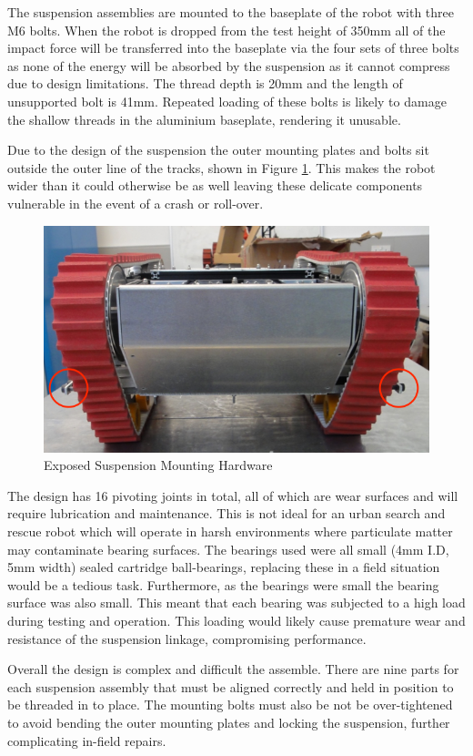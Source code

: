 The suspension assemblies are mounted to the baseplate of the robot with three M6 bolts. When the robot is dropped from the test height of 350mm all of the impact force will be transferred into the baseplate via the four sets of three bolts as none of the energy will be absorbed by the suspension as it cannot compress due to design limitations. The thread depth is 20mm and the length of unsupported bolt is 41mm. Repeated loading of these bolts is likely to damage the shallow threads in the aluminium baseplate, rendering it unusable. \par

Due to the design of the suspension the outer mounting plates and bolts sit outside the outer line of the tracks, shown in Figure \ref{fig:OrionFront}. This makes the robot wider than it could otherwise be as well leaving these delicate components vulnerable in the event of a crash or roll-over. \par

\begin{figure}[h]
\centering\includegraphics[width=0.6\linewidth]{Images/MaxImages/OrionFront.png}
\caption{Exposed Suspension Mounting Hardware}
\label{fig:OrionFront}
\end{figure}

The design has 16 pivoting joints in total, all of which are wear surfaces and will require lubrication and maintenance. This is not ideal for an urban search and rescue robot which will operate in harsh environments where particulate matter may contaminate bearing surfaces. The bearings used were all small (4mm I.D, 5mm width) sealed cartridge ball-bearings, replacing these in a field situation would be a tedious task. Furthermore, as the bearings were small the bearing surface was also small. This meant that each bearing was subjected to a high load during testing and operation. This loading would likely cause premature wear and resistance of the suspension linkage, compromising performance.

Overall the design is complex and difficult the assemble. There are nine parts for each suspension assembly that must be aligned correctly and held in position to be threaded in to place. The mounting bolts must also be not be over-tightened to avoid bending the outer mounting plates and locking the suspension, further complicating in-field repairs. 

